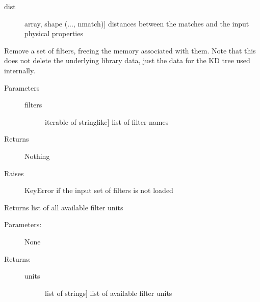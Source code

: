 \documentclass[letterpaper,10pt,english]{sphinxmanual}
\begin{document}
\begin{fulllineitems}
\begin{fulllineitems}
\begin{description}
\begin{description}
\item[{dist}] \leavevmode{[}array, shape (..., nmatch){]}
distances between the matches and the input physical
properties

\end{description}

\end{description}

\end{fulllineitems}


\begin{fulllineitems}
\label{cluster_slug:slugpy.cluster_slug.cluster_slug.del_filters}
Remove a set of filters, freeing the memory associated with
them. Note that this does not delete the underlying library
data, just the data for the KD tree used internally.
\begin{description}
\item[{Parameters}] \leavevmode\begin{description}
\item[{filters}] \leavevmode{[}iterable of stringlike{]}
list of filter names

\end{description}

\item[{Returns}] \leavevmode
Nothing

\item[{Raises}] \leavevmode
KeyError if the input set of filters is not loaded

\end{description}

\end{fulllineitems}


\begin{fulllineitems}
\label{cluster_slug:slugpy.cluster_slug.cluster_slug.filter_units}
Returns list of all available filter units
\begin{description}
\item[{Parameters:}] \leavevmode
None

\item[{Returns:}] \leavevmode\begin{description}
\item[{units}] \leavevmode{[}list of strings{]}
list of available filter units


\end{description}
\end{description}
\end{fulllineitems}
\end{fulllineitems}
\end{document}
